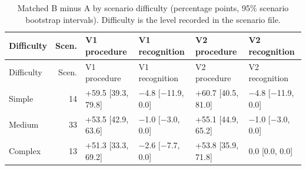 \begin{longtable}{@{}lrllll@{}}
\caption{Matched B minus A by scenario difficulty (percentage points, 95\% scenario bootstrap intervals). Difficulty is the level recorded in the scenario file.}\label{tab:by_difficulty}\\
\toprule Difficulty & Scen. & V1 procedure & V1 recognition & V2 procedure & V2 recognition \\ \midrule \endfirsthead
\toprule Difficulty & Scen. & V1 procedure & V1 recognition & V2 procedure & V2 recognition \\ \midrule \endhead
\bottomrule \endfoot
Simple & 14 & +59.5 [39.3, 79.8] & $-$4.8 [$-$11.9, 0.0] & +60.7 [40.5, 81.0] & $-$4.8 [$-$11.9, 0.0] \\
Medium & 33 & +53.5 [42.9, 63.6] & $-$1.0 [$-$3.0, 0.0] & +55.1 [44.9, 65.2] & $-$1.0 [$-$3.0, 0.0] \\
Complex & 13 & +51.3 [33.3, 69.2] & $-$2.6 [$-$7.7, 0.0] & +53.8 [35.9, 71.8] & 0.0 [0.0, 0.0] \\
\end{longtable}
\normalsize
